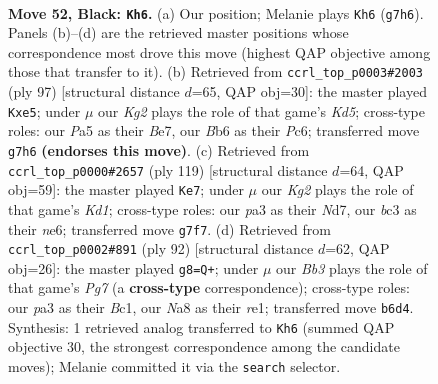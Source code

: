 \documentclass[11pt]{article}
\begin{document}
\clearpage

\begin{figure}[p]\centering
\begin{subfigure}{0.46\textwidth}\centering
\resizebox{\linewidth}{!}{%
\newchessgame
\chessboard[
  setfen={nn6/1p4k1/1b6/pN1p4/6bp/PPB1P3/4P1K1/3B4 b - - 1 52},
  showmover=false,
  pgfstyle=straightmove, color=movearrow, markmove={g7-h6}
]}
\caption{}
\end{subfigure}\hfill
\begin{subfigure}{0.46\textwidth}\centering
\resizebox{\linewidth}{!}{%
\newchessgame
\chessboard[
  setfen={8/4b1p1/2p3p1/4B1P1/1pPk4/1P4P1/r2NK3/7R b - - 0 49},
  showmover=false,
  pgfstyle=straightmove, color=movearrow, markmove={d4-e5}
]}
\caption{}
\end{subfigure}
\\[4pt]
\begin{subfigure}{0.46\textwidth}\centering
\resizebox{\linewidth}{!}{%
\newchessgame
\chessboard[
  setfen={3k4/3n4/2p1Npb1/6pp/1K1PP3/6P1/2B3P1/8 b - - 28 60},
  showmover=false,
  pgfstyle=straightmove, color=movearrow, markmove={d8-e7}
]}
\caption{}
\end{subfigure}\hfill
\begin{subfigure}{0.46\textwidth}\centering
\resizebox{\linewidth}{!}{%
\newchessgame
\chessboard[
  setfen={8/R1p2kP1/2bp4/3n2P1/6B1/1Pp3K1/2P5/2B1r3 w - - 1 47},
  showmover=false,
  pgfstyle=straightmove, color=movearrow, markmove={g7-g8}
]}
\caption{}
\end{subfigure}
\caption{\textbf{Move 52, Black: \texttt{Kh6}.} (a) Our position; Melanie plays \texttt{Kh6} (\texttt{g7h6}). Panels (b)--(d) are the retrieved master positions whose correspondence most drove this move (highest QAP objective among those that transfer to it). (b) Retrieved from \texttt{ccrl\_top\_p0003\#2003} (ply 97) [structural distance $d$=65, QAP obj=30]: the master played \texttt{Kxe5}; under $\mu$ our \emph{Kg2} plays the role of that game's \emph{Kd5}; cross-type roles: our \emph{P}a5 as their \emph{B}e7, our \emph{B}b6 as their \emph{P}c6; transferred move \texttt{g7h6} \textbf{(endorses this move)}. (c) Retrieved from \texttt{ccrl\_top\_p0000\#2657} (ply 119) [structural distance $d$=64, QAP obj=59]: the master played \texttt{Ke7}; under $\mu$ our \emph{Kg2} plays the role of that game's \emph{Kd1}; cross-type roles: our \emph{p}a3 as their \emph{N}d7, our \emph{b}c3 as their \emph{n}e6; transferred move \texttt{g7f7}. (d) Retrieved from \texttt{ccrl\_top\_p0002\#891} (ply 92) [structural distance $d$=62, QAP obj=26]: the master played \texttt{g8=Q+}; under $\mu$ our \emph{Bb3} plays the role of that game's \emph{Pg7} (a \textbf{cross-type} correspondence); cross-type roles: our \emph{p}a3 as their \emph{B}c1, our \emph{N}a8 as their \emph{r}e1; transferred move \texttt{b6d4}. Synthesis: 1 retrieved analog transferred to \texttt{Kh6} (summed QAP objective 30, the strongest correspondence among the candidate moves); Melanie committed it via the \texttt{search} selector.}
\label{fig:thought-m103}
\end{figure}
\end{document}
